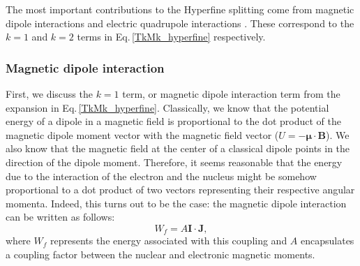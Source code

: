 The most important contributions to the Hyperfine splitting come from magnetic dipole interactions and electric quadrupole interactions \cite{sobelman_spectra}\cite{schwartz_hyperfine_expansion}\cite{cuaMITnotes}. These correspond to the $k=1$ and $k=2$ terms in Eq.\,\eqref{TkMk_hyperfine} respectively\cite{experimental_hyperfine_alkali_arimondo}.
\subsubsection{Magnetic dipole interaction}
First, we discuss the $k=1$ term, or magnetic dipole interaction term from the expansion in Eq.\,\eqref{TkMk_hyperfine}. Classically, we know that the potential energy of a dipole in a magnetic field is proportional to the dot product of the magnetic dipole moment vector with the magnetic field vector ($U=-\mathbf{\mu}\cdot\mathbf{B}$). We also know that the magnetic field at the center of a classical dipole points in the direction of the dipole moment. Therefore, it seems reasonable that the energy due to the interaction of the electron and the nucleus might be somehow proportional to a dot product of two vectors representing their respective angular momenta. Indeed, this turns out to be the case: the magnetic dipole interaction can be written as follows\cite{sobelman_spectra}: 
\begin{equation}\label{IdotJ}
W_f=A\mathbf{I}\cdot\mathbf{J},
\end{equation}
where $W_f$ represents the energy associated with this coupling and $A$ encapsulates a coupling factor between the nuclear and electronic magnetic moments. 

